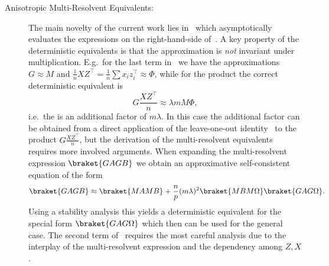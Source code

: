 \begin{description}
    \item[Anisotropic Multi-Resolvent Equivalents: ] The main novelty of the current work lies in~ which asymptotically evaluates the expressions on the right-hand-side of~. A key property of the deterministic equivalents is that the approximation is \emph{not} invariant under multiplication. E.g.\ for the last term in~ we have the approximations $G\approx M$ and $\frac{1}{n}XZ^\top=\frac{1}{n}\sum x_i z_i^\top \approx \Phi$, while for the product the correct deterministic equivalent is
        \begin{equation}
            G \frac{X Z^\top}{n} \approx \lambda m M\Phi,
        \end{equation}
        i.e.\ the is an additional factor of $m\lambda$. In this case the additional factor can be obtained from a direct application of the leave-one-out identity~ to the product $G\frac{XZ^\top}{n}$, but the derivation of the multi-resolvent equivalents requires more involved arguments. When expanding the multi-resolvent expression $\braket{GAGB}$ we obtain an approximative self-consistent equation of the form 
\begin{equation*}
   \braket{GAGB}\approx \braket{MAMB} + \frac{n}{p}(m\lambda)^2 \braket{M B M \Omega} \braket{G A G\Omega}.
\end{equation*}
Using a stability analysis this yields a deterministic equivalent for the special form $\braket{GAG\Omega}$ which then can be used for the general case. The second term of~ requires the most careful analysis due to the interplay of the multi-resolvent expression and the dependency among $Z,X$. 
\end{description}